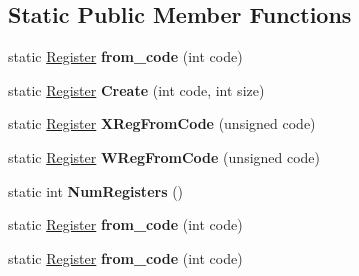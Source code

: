 \subsection*{Static Public Member Functions}
\begin{DoxyCompactItemize}
\item 
static \hyperlink{structv8_1_1internal_1_1_register}{Register} {\bfseries from\+\_\+code} (int code)\hypertarget{structv8_1_1internal_1_1_register_a43d9a3408aeddbfafaaf5cccce57ac59}{}\label{structv8_1_1internal_1_1_register_a43d9a3408aeddbfafaaf5cccce57ac59}

\item 
static \hyperlink{structv8_1_1internal_1_1_register}{Register} {\bfseries Create} (int code, int size)\hypertarget{structv8_1_1internal_1_1_register_ab523a8bbaef5738cee35dca4b339da08}{}\label{structv8_1_1internal_1_1_register_ab523a8bbaef5738cee35dca4b339da08}

\item 
static \hyperlink{structv8_1_1internal_1_1_register}{Register} {\bfseries X\+Reg\+From\+Code} (unsigned code)\hypertarget{structv8_1_1internal_1_1_register_a6bc72db8c208ebd60c4fafe95167d380}{}\label{structv8_1_1internal_1_1_register_a6bc72db8c208ebd60c4fafe95167d380}

\item 
static \hyperlink{structv8_1_1internal_1_1_register}{Register} {\bfseries W\+Reg\+From\+Code} (unsigned code)\hypertarget{structv8_1_1internal_1_1_register_a38f966f971bdff0ce3230f9bdf3ee84f}{}\label{structv8_1_1internal_1_1_register_a38f966f971bdff0ce3230f9bdf3ee84f}

\item 
static int {\bfseries Num\+Registers} ()\hypertarget{structv8_1_1internal_1_1_register_a21281f6dfc2a4242204d0d0a57fb37ae}{}\label{structv8_1_1internal_1_1_register_a21281f6dfc2a4242204d0d0a57fb37ae}

\item 
static \hyperlink{structv8_1_1internal_1_1_register}{Register} {\bfseries from\+\_\+code} (int code)\hypertarget{structv8_1_1internal_1_1_register_a43d9a3408aeddbfafaaf5cccce57ac59}{}\label{structv8_1_1internal_1_1_register_a43d9a3408aeddbfafaaf5cccce57ac59}

\item 
static \hyperlink{structv8_1_1internal_1_1_register}{Register} {\bfseries from\+\_\+code} (int code)\hypertarget{structv8_1_1internal_1_1_register_a43d9a3408aeddbfafaaf5cccce57ac59}{}\label{structv8_1_1internal_1_1_register_a43d9a3408aeddbfafaaf5cccce57ac59}


\end{DoxyCompactItemize}
